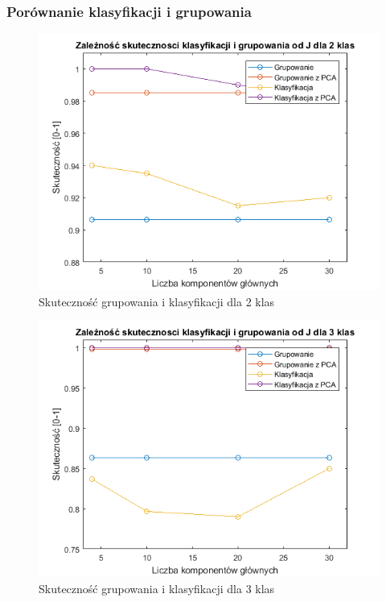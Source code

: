 \subsubsection{Porównanie klasyfikacji i grupowania}

\begin{figure}[H]
	\centering
	\includegraphics{img/acc_from_J_2classes.png}
	\caption{Skuteczność grupowania i klasyfikacji dla 2 klas}  
	\label{rys:acc_from_J_2classes} 
\end{figure}

\begin{figure}[H]
	\centering
	\includegraphics{img/acc_from_J_3classes.png}
	\caption{Skuteczność grupowania i klasyfikacji dla 3 klas}  
	\label{rys:acc_from_J_3classes} 
\end{figure}

